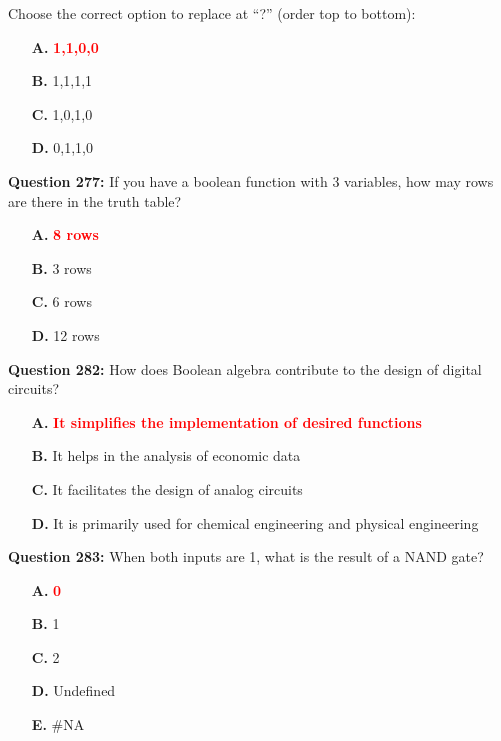 \documentclass[12pt,a4paper]{article}
\begin{document}
Choose the correct option to replace at ``?'' (order top to bottom):

\begin{itemize}
    \item[\textbf{A.}] \textcolor{red}{\textbf{1,1,0,0}}
    \item[\textbf{B.}] 1,1,1,1
    \item[\textbf{C.}] 1,0,1,0
    \item[\textbf{D.}] 0,1,1,0
\end{itemize}

\vspace{0.5cm}

\textbf{Question 277:} If you have a boolean function with 3 variables, how may rows are there in the truth table?

\begin{itemize}
    \item[\textbf{A.}] \textcolor{red}{\textbf{8 rows}}
    \item[\textbf{B.}] 3 rows
    \item[\textbf{C.}] 6 rows
    \item[\textbf{D.}] 12 rows
\end{itemize}

\vspace{0.5cm}

\vspace{0.5cm}

\textbf{Question 282:} How does Boolean algebra contribute to the design of digital circuits?

\begin{itemize}
    \item[\textbf{A.}] \textcolor{red}{\textbf{It simplifies the implementation of desired functions}}
    \item[\textbf{B.}] It helps in the analysis of economic data
    \item[\textbf{C.}] It facilitates the design of analog circuits
    \item[\textbf{D.}] It is primarily used for chemical engineering and physical engineering
\end{itemize}

\vspace{0.5cm}

\vspace{0.5cm}

\textbf{Question 283:} When both inputs are 1, what is the result of a NAND gate?

\begin{itemize}
    \item[\textbf{A.}] \textcolor{red}{\textbf{0}}
    \item[\textbf{B.}] 1
    \item[\textbf{C.}] 2
    \item[\textbf{D.}] Undefined
    \item[\textbf{E.}] \#NA
\end{itemize}
\end{document}
